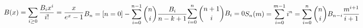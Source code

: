 \begin{math}
    \begin{aligned}B(x)=\sum_{i\ge 0}\frac{B_i x^i}{i!}=\frac x{e^x-1}\end{aligned} \\
    \begin{aligned}B_n=[n=0]-\sum_{i=0}^{n-1}{n\choose i}\frac{B_i}{n-k+1}\end{aligned} \\
    \begin{aligned}\sum_{i=0}^n{n+1\choose i}B_i=0\end{aligned} \\
    \begin{aligned}S_n(m)=\sum_{i=0}^{m-1}i^n=\sum_{i=0}^n{n\choose i}B_{n-i}\frac{m^{i+1}}{i+1}\end{aligned}
\end{math}